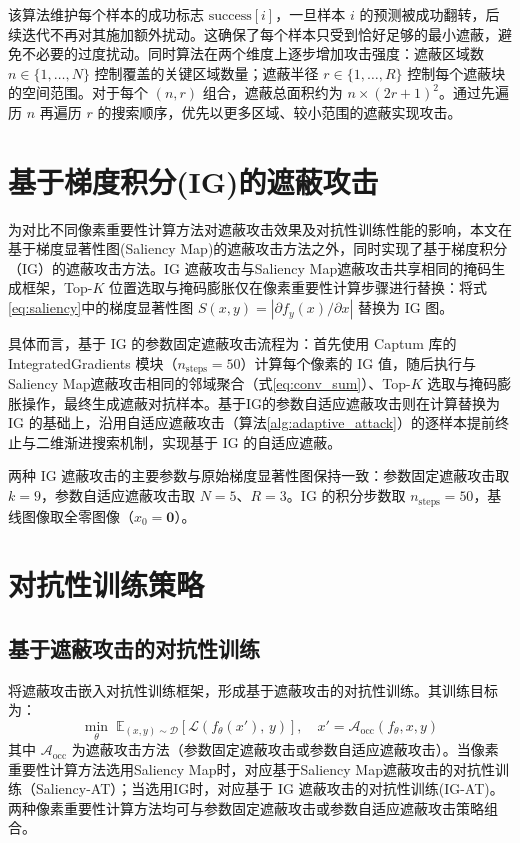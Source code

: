 该算法维护每个样本的成功标志 $\mathrm{success}[i]$，一旦样本 $i$ 的预测被成功翻转，后续迭代不再对其施加额外扰动。这确保了每个样本只受到恰好足够的最小遮蔽，避免不必要的过度扰动。同时算法在两个维度上逐步增加攻击强度：遮蔽区域数 $n \in \{1, \ldots, N\}$ 控制覆盖的关键区域数量；遮蔽半径 $r \in \{1, \ldots, R\}$ 控制每个遮蔽块的空间范围。对于每个 $(n, r)$ 组合，遮蔽总面积约为 $n \times (2r+1)^2$。通过先遍历 $n$ 再遍历 $r$ 的搜索顺序，优先以更多区域、较小范围的遮蔽实现攻击。



\section{基于梯度积分(IG)的遮蔽攻击}

为对比不同像素重要性计算方法对遮蔽攻击效果及对抗性训练性能的影响，本文在基于梯度显著性图(Saliency Map)的遮蔽攻击方法之外，同时实现了基于梯度积分（IG）的遮蔽攻击方法。IG 遮蔽攻击与Saliency Map遮蔽攻击共享相同的掩码生成框架，Top-$K$ 位置选取与掩码膨胀仅在像素重要性计算步骤进行替换：将式\eqref{eq:saliency}中的梯度显著性图 $S(x,y) = |\partial f_y(x)/\partial x|$ 替换为 IG 图。

具体而言，基于 IG 的参数固定遮蔽攻击流程为：首先使用 Captum 库\cite{Kokhlikyan2020CaptumAU}的 IntegratedGradients 模块（$n_{\text{steps}}=50$）计算每个像素的 IG 值，随后执行与Saliency Map遮蔽攻击相同的邻域聚合（式\eqref{eq:conv_sum}）、Top-$K$ 选取与掩码膨胀操作，最终生成遮蔽对抗样本。基于IG的参数自适应遮蔽攻击则在计算替换为 IG 的基础上，沿用自适应遮蔽攻击（算法\ref{alg:adaptive_attack}）的逐样本提前终止与二维渐进搜索机制，实现基于 IG 的自适应遮蔽。

两种 IG 遮蔽攻击的主要参数与原始梯度显著性图保持一致：参数固定遮蔽攻击取 $k=9$，参数自适应遮蔽攻击取 $N=5$、$R=3$。IG 的积分步数取 $n_{\text{steps}}=50$，基线图像取全零图像（$x_0 = \mathbf{0}$）。

\section{对抗性训练策略}

\subsection{基于遮蔽攻击的对抗性训练}

将遮蔽攻击嵌入对抗性训练框架，形成基于遮蔽攻击的对抗性训练。其训练目标为：
\begin{equation}
  \min_{\theta} \; \mathbb{E}_{(x,y)\sim\mathcal{D}} \left[ \mathcal{L}\!\left(f_{\theta}(x'),\, y\right) \right], \quad x' = \mathcal{A}_{\text{occ}}(f_{\theta}, x, y)
\end{equation}
其中 $\mathcal{A}_{\text{occ}}$ 为遮蔽攻击方法（参数固定遮蔽攻击或参数自适应遮蔽攻击）。当像素重要性计算方法选用Saliency Map时，对应基于Saliency Map遮蔽攻击的对抗性训练（Saliency-AT）；当选用IG时，对应基于 IG 遮蔽攻击的对抗性训练(IG-AT)。两种像素重要性计算方法均可与参数固定遮蔽攻击或参数自适应遮蔽攻击策略组合。

